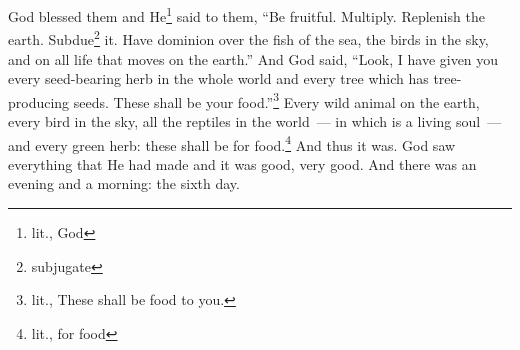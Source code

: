 \begin{enumerate}[align=center]
     God blessed them and He\footnote{lit., God} said to them, ``Be fruitful. Multiply. Replenish the earth. Subdue\footnote{subjugate} it. Have dominion over the fish of the sea, the birds in the sky, and on all life that moves on the earth.''%
     And God said, ``Look, I have given you every seed-bearing herb in the whole world and every tree which has tree-producing seeds. These shall be your food.''\footnote{lit., These shall be food to you.}%
     Every wild animal on the earth, every bird in the sky, all the reptiles in the world~--- in which is a living soul~--- and every green herb: these shall be for food.\footnote{lit., for food} And thus it was.%
     God saw everything that He had made and it was good, very good. And there was an evening and a morning: the sixth day.%
\end{enumerate}

